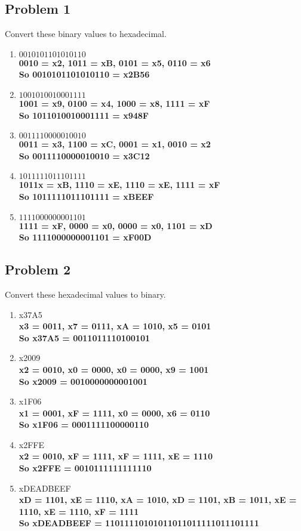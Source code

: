 \documentclass{article}
\begin{document}
\subsection*{Problem 1}
Convert these binary values to hexadecimal.
\begin{enumerate}[label=\alph*.]
    \item $0010 1011 0101 0110$\\
    \textbf{0010 = x2, 1011 = xB, 0101 = x5, 0110 = x6\\
            So 0010101101010110 = x2B56}
    \item $1001 0100 1000 1111$\\
    \textbf{1001 = x9, 0100 = x4, 1000 = x8, 1111 = xF\\
            So 1011010010001111 = x948F}
    \item $0011 1100 0001 0010$\\
    \textbf{0011 = x3, 1100 = xC, 0001 = x1, 0010 = x2\\
            So 0011110000010010 = x3C12}
    \item $1011 1110 1110 1111$\\
    \textbf{1011x = xB, 1110 = xE, 1110 = xE, 1111 = xF\\
            So 1011111011101111 = xBEEF}
    \item $1111 0000 0000 1101$\\
    \textbf{1111 = xF, 0000 = x0, 0000 = x0, 1101 = xD\\
            So 1111000000001101 = xF00D}
\end{enumerate}

\subsection*{Problem 2}
Convert these hexadecimal values to binary.
\begin{enumerate}[label=\alph*.]
    \item x37A5\\
    \textbf{x3 = 0011, x7 = 0111, xA = 1010, x5 = 0101\\
            So x37A5 = 0011011110100101}
    \item x2009\\
    \textbf{x2 = 0010, x0 = 0000, x0 = 0000, x9 = 1001\\
            So x2009 = 0010000000001001}
    \item x1F06\\
    \textbf{x1 = 0001, xF = 1111, x0 = 0000, x6 = 0110\\
            So x1F06 = 0001111100000110}
    \item x2FFE\\
    \textbf{x2 = 0010, xF = 1111, xF = 1111, xE = 1110\\
            So x2FFE = 0010111111111110}
    \item xDEADBEEF\\
    \textbf{xD = 1101, xE = 1110, xA = 1010, xD = 1101, xB = 1011, xE = 1110, xE = 1110, xF =   1111\\
            So xDEADBEEF = 11011110101011011011111011101111}
\end{enumerate}
\end{document}
